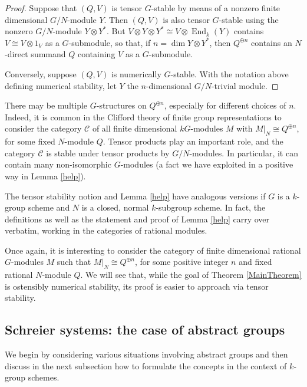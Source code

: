 \documentclass[11pt,leqno,amscd,amssymb,verbatim, url]{amsart}
\theoremstyle{definition}
\numberwithin{equation}{thm}
\newcommand{\End}{\operatorname{End}}
\begin{document}
\begin{proof} Suppose that $(Q,V)$ is tensor $G$-stable by means of a nonzero finite dimensional $G/N$-module $Y$. Then $(Q,V)$
is also tensor $G$-stable using the nonzero $G/N$-module $Y\otimes Y^*$. But $V\otimes Y\otimes Y^*\cong V\otimes\End_k(Y)$ contains
$V\cong V\otimes 1_V$ as a $G$-submodule, so that, if $n=\dim Y\otimes Y^*$, then $Q^{\oplus n}$ contains an $N$-direct
summand $Q$ containing $V$ as a $G$-submodule.

Conversely, suppose $(Q,V)$ is numerically $G$-stable. With the notation above defining numerical 
stability, let $Y$ the $n$-dimensional $G/N$-trivial module. \end{proof}

There may be multiple $G$-structures on $Q^{\oplus n}$, especially for different choices
of $n$. Indeed, it is common in the Clifford theory of finite group representations \cite{Cline} to consider the
category $\mathcal C$ of all finite dimensional $kG$-modules $M$
with $M|_N\cong Q^{\oplus n}$, for some fixed $N$-module $Q$. Tensor products play an important role, and the category $\mathcal C$ is stable under tensor products
by $G/N$-modules. In particular, it can contain many non-isomorphic $G$-modules (a fact we have exploited in a positive way in
Lemma \ref{help}).

The tensor stability notion and Lemma \ref{help}
have analogous versions if $G$ is a $k$-group scheme and $N$ is a closed, normal $k$-subgroup scheme.
In fact, the definitions as well as the statement and proof of Lemma \ref{help} carry over verbatim, working
in the categories of rational modules.

Once again, it is interesting to consider the category of finite dimensional rational $G$-modules $M$ such that $M|_N
\cong Q^{\oplus n}$, for some positive integer $n$ and fixed rational $N$-module $Q$. We will see that, while the
goal of Theorem \ref{MainTheorem} is ostensibly numerical stability, its proof is easier to approach via tensor stability.

 \subsection{Schreier systems: the case of abstract groups} We begin by considering various situations involving abstract
 groups and then discuss in the next subsection how to formulate the concepts in the context of  $k$-group schemes.
\end{document}
